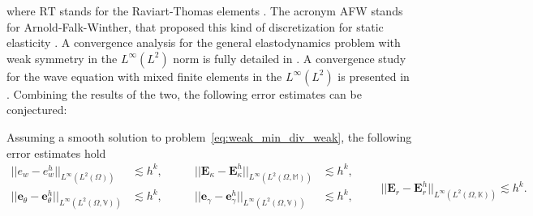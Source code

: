 where $\mathrm{RT}$ stands for the Raviart-Thomas elements \cite{raviart1977}. The acronym AFW stands for Arnold-Falk-Winther, that proposed this kind of discretization for static elasticity \cite{arnold2007mixed}. A convergence analysis for the general elastodynamics problem with weak symmetry in the $L^\infty (L^2)$ norm is fully detailed in \cite{arnold2014elastodynamics}. A convergence study for the wave equation with mixed finite elements in the $L^\infty (L^2)$ is presented in \cite{geveci1988}. Combining the results of the two, the following error estimates can be conjectured:
\begin{conjecture}\label{conj:AWFestimates}
	Assuming a smooth solution to problem~\eqref{eq:weak_min_div_weak}, the following error estimates hold 
	\begin{equation}
	\label{eq:errAFW}
	\begin{aligned}
	||e_w - e_w^h||_{L^{\infty}(L^2(\Omega))} &\lesssim h^{k}, \\
	||\bm{e}_\theta - \bm{e}_\theta^h||_{L^{\infty}(L^2(\Omega, \mathbb{V}))} &\lesssim h^{k}, \\
	\end{aligned} \qquad
	\begin{aligned}
	||\bm{E}_\kappa - \bm{E}_\kappa^h||_{L^{\infty}(L^2(\Omega, \mathbb{M}))} &\lesssim  h^{k}, \\
	||\bm{e}_\gamma - \bm{e}_\gamma^ h||_{L^{\infty}(L^2(\Omega, \mathbb{V}))} &\lesssim  h^{k}, \\
	\end{aligned} \qquad
	||\bm{E}_r - \bm{E}_r^h||_{L^{\infty}(L^2(\Omega, \mathbb{K}))} \lesssim h^{k}. 
	\end{equation}
\end{conjecture}

